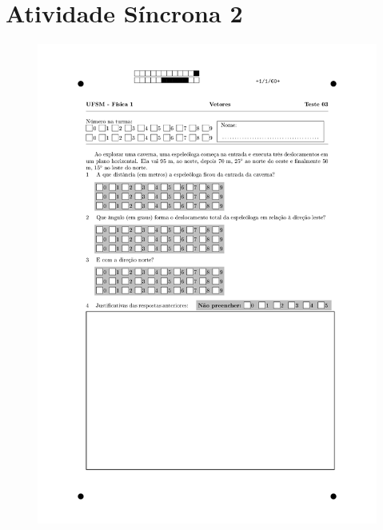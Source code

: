 \section{Atividade Síncrona 2} \label{ch:orp1e2}
\vspace*{\fill}
\begin{figure}[H]\centering
\includegraphics[scale=0.7]{fig/orp1q2_page-0001.jpg}
\end{figure}
\vspace*{\fill}
